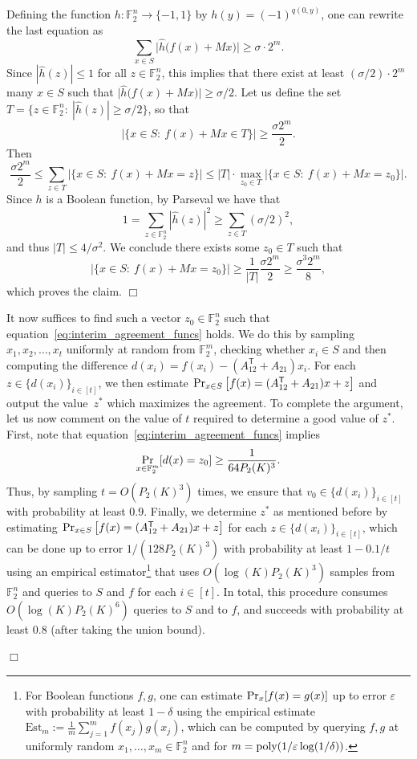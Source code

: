 \documentclass[11pt]{amsart}
\renewcommand{\Pr}{\mathop{\mbox{\rm Pr}}}
\newcommand{\F}{\mathbb{F}} %
\newcommand{\poly}{\mbox{\rm poly}}
\newcommand{\tp}{\mathsf{T}}
\theoremstyle{plain}
\theoremstyle{definition}
\theoremstyle{remark}
\renewenvironment{proof}[1][]{
    	\begin{trivlist}
     	\item[\hspace{\labelsep}{\em\noindent Proof#1:\/}]}
     	{{\hfill$\Box$}
    	\end{trivlist}
  }
\begin{document}
\begin{proof}
\begin{proof}
Defining the function $h: \F_2^n \rightarrow \{-1,1\}$ by $h(y)=(-1)^{q(0, y)}$, one can rewrite the last equation as
$$\sum_{x \in S} \big| \widehat{h}\big(f(x) + Mx\big) \big| \geq \sigma\cdot 2^m.$$
Since $|\widehat{h}(z)| \leq 1$ for all $z\in \F_2^n$, this implies that there exist at least $(\sigma/2)\cdot 2^m$ many $x \in S$ such that $\big| \widehat{h}\big(f(x) + Mx\big) \big| \geq \sigma/2$.
Let us define the set $T = \big\{z \in \F_2^n:\: |\widehat{h}(z)| \geq \sigma/2\big\}$, so that
$$\big|\big\{x\in S:\: f(x)+Mx \in T\big\}\big| \geq \frac{\sigma 2^m}{2}.$$
Then
$$\frac{\sigma 2^m}{2} \leq \sum_{z\in T} \big|\big\{x\in S:\: f(x)+Mx = z\big\}\big| \leq |T| \cdot \max_{z_0\in T} \big|\big\{x\in S:\: f(x)+Mx = z_0\big\}\big|.$$
Since $h$ is a Boolean function, by Parseval we have that
$$1 = \sum_{z \in \F_2^n} |\widehat{h}(z)|^2 \geq \sum_{z \in T} (\sigma/2)^2,$$
and thus $|T| \leq 4/\sigma^2$.
We conclude there exists some $z_0\in T$ such that
$$\big|\big\{x\in S:\: f(x)+Mx = z_0\big\}\big| \geq \frac{1}{|T|} \frac{\sigma 2^m}{2} \geq \frac{\sigma^3 2^m}{8},$$
which proves the claim.
\end{proof}

It now suffices to find such a vector $z_0\in \F_2^n$ such that  equation~\eqref{eq:interim_agreement_funcs} holds.
We do this by sampling $x_1, x_2, \ldots, x_t$ uniformly at random from $\F_2^m$, checking whether $x_i \in S$ and then computing the difference $d(x_i) = f(x_i) - (A_{12}^\tp + A_{21}) x_i$. 
For each $z \in \{d(x_i)\}_{i \in [t]}$, we then estimate $\Pr_{x \in S}\big[f(x) = (A_{12}^\tp + A_{21})x + z\big]$ and output the value~$z^*$ which maximizes the agreement.
To complete the argument, let us now comment on the value of $t$ required to determine a good value of $z^*$.
First, note that equation~\eqref{eq:interim_agreement_funcs} implies
$$\Pr_{x \in \F_2^m}[d(x) = z_0] \geq \frac{1}{64 P_2(K)^3}.$$
Thus, by sampling $t = O(P_2(K)^3)$ times, we ensure that $v_0 \in \{d(x_i)\}_{i \in [t]}$ with probability at least $0.9$.
Finally, we determine $z^*$ as mentioned before by estimating $\Pr_{x \in S}\big[f(x) = (A_{12}^\tp + A_{21})x + z\big]$ for each $z \in \{d(x_i)\}_{i \in [t]}$, which can be done up to error $1/(128 P_2(K)^3)$ with probability at least $1-0.1/t$ using an empirical estimator\footnote{For Boolean functions $f,g$, one can estimate $\Pr_{x}[f(x) = g(x)]$ up to error $\varepsilon$ with probability at least $1-\delta$ using the empirical estimate
$\mathrm{Est}_m := \frac{1}{m} \sum_{j =1}^m f(x_j) g(x_j)$,
which can be computed by querying $f,g$ at uniformly random  $x_1,\ldots,x_m \in \F_2^n$ and for $m = \poly(1/\varepsilon \log(1/\delta))$.}
that uses $O(\log(K) P_2(K)^3)$ samples from $\F_2^n$ and queries to $S$ and $f$ for each $i \in [t]$.
In total, this procedure consumes $O(\log(K) P_2(K)^{6})$ queries to $S$ and to $f$, and succeeds with probability at least $0.8$ (after taking the union bound).


\end{proof}
\end{document}
